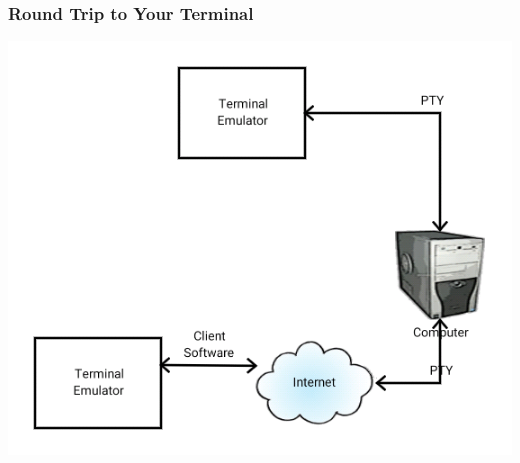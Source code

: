 \documentclass{beamer}
\begin{document}
\begin{frame}
    \frametitle{Round Trip to Your Terminal}
    \begin{center}
        \includegraphics[height=0.8\textheight]{images/ttymodern}
    \end{center}
\end{frame}
\end{document}
